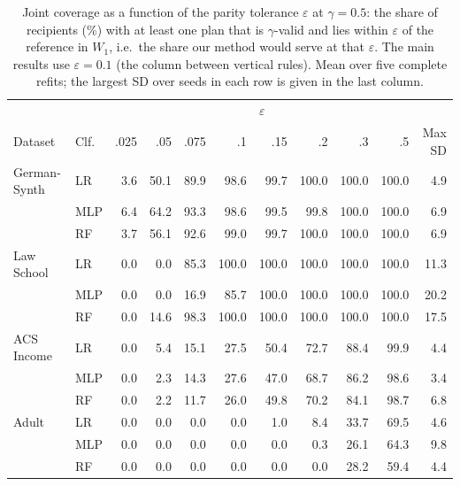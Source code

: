 \begin{table}[t]
\centering
\small
\caption{Joint coverage as a function of the parity tolerance $\varepsilon$
at $\gamma=0.5$: the share of recipients (\%) with at least one plan that is
$\gamma$-valid and lies within $\varepsilon$ of the reference in $W_1$, i.e.\
the share our method would serve at that $\varepsilon$. The main results use
$\varepsilon=0.1$ (the column between vertical rules). Mean over five complete refits; the largest
SD over seeds in each row is given in the last column.}
\label{tab:app_coverage}
\setlength{\tabcolsep}{4pt}
\begin{tabular}{ll rrr|r|rrrr r}
\hline
& & \multicolumn{8}{c}{$\varepsilon$} & \\
Dataset & Clf. & .025 & .05 & .075 & .1 & .15 & .2 & .3 & .5 & Max SD \\
\hline
German-Synth & LR & 3.6 & 50.1 & 89.9 & 98.6 & 99.7 & 100.0 & 100.0 & 100.0 & 4.9 \\
 & MLP & 6.4 & 64.2 & 93.3 & 98.6 & 99.5 & 99.8 & 100.0 & 100.0 & 6.9 \\
 & RF & 3.7 & 56.1 & 92.6 & 99.0 & 99.7 & 100.0 & 100.0 & 100.0 & 6.9 \\
\hline
Law School & LR & 0.0 & 0.0 & 85.3 & 100.0 & 100.0 & 100.0 & 100.0 & 100.0 & 11.3 \\
 & MLP & 0.0 & 0.0 & 16.9 & 85.7 & 100.0 & 100.0 & 100.0 & 100.0 & 20.2 \\
 & RF & 0.0 & 14.6 & 98.3 & 100.0 & 100.0 & 100.0 & 100.0 & 100.0 & 17.5 \\
\hline
ACS Income & LR & 0.0 & 5.4 & 15.1 & 27.5 & 50.4 & 72.7 & 88.4 & 99.9 & 4.4 \\
 & MLP & 0.0 & 2.3 & 14.3 & 27.6 & 47.0 & 68.7 & 86.2 & 98.6 & 3.4 \\
 & RF & 0.0 & 2.2 & 11.7 & 26.0 & 49.8 & 70.2 & 84.1 & 98.7 & 6.8 \\
\hline
Adult & LR & 0.0 & 0.0 & 0.0 & 0.0 & 1.0 & 8.4 & 33.7 & 69.5 & 4.6 \\
 & MLP & 0.0 & 0.0 & 0.0 & 0.0 & 0.0 & 0.3 & 26.1 & 64.3 & 9.8 \\
 & RF & 0.0 & 0.0 & 0.0 & 0.0 & 0.0 & 0.0 & 28.2 & 59.4 & 4.4 \\
\hline
\end{tabular}
\end{table}

